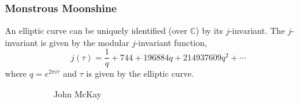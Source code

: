 \begin{frame}[plain] \frametitle{Monstrous Moonshine} \scriptsize
An elliptic curve can be uniquely identified (over $\mathbb{C}$) by its $j$-invariant. The $j$-invariant is given by the modular $j$-invariant function,
	\[
	j(\tau)= \dfrac{1}{q} + 744 + 196884q + 214937609q^2 + \cdots
	\]
where $q= e^{2\pi i \tau}$ and $\tau$ is given by the elliptic curve. \pspace

	\begin{figure}[h]
	\centering
	\begin{subfigure}{0.20\textwidth}
	\captionsetup{labelformat=empty}
	\centering
	\caption{\tiny John McKay}
	\end{subfigure} \quad
	\begin{subfigure}{0.20\textwidth}
	\captionsetup{labelformat=empty}
	\centering

\end{subfigure}
\end{figure}
\end{frame}
